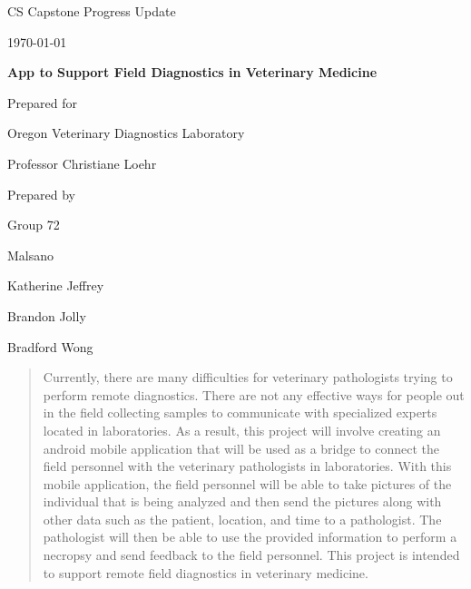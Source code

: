 \documentclass[onecolumn, draftclsnofoot,10pt, compsoc]{IEEEtran}
\def \CapstoneTeamName{		Malsano}
\def \CapstoneTeamNumber{		72}
\def \GroupMemberOne{			Katherine Jeffrey}
\def \GroupMemberTwo{			Brandon Jolly}
\def \GroupMemberThree{			Bradford Wong}
\def \CapstoneProjectName{		App to Support Field Diagnostics in Veterinary Medicine}
\def \CapstoneSponsorCompany{	Oregon Veterinary Diagnostics Laboratory}
\def \CapstoneSponsorPerson{		Professor Christiane Loehr}
\def \DocType{		%
				Progress Update
				}
\newcommand{\NameSigPair}[1]{\par
\makebox[2.75in][r]{#1} \hfil 	\makebox[3.25in]{\makebox[2.25in]{\hrulefill} \hfill		\makebox[.75in]{\hrulefill}}
\par\vspace{-12pt} \textit{\tiny\noindent
\makebox[2.75in]{} \hfil		\makebox[3.25in]{\makebox[2.25in][r]{Signature} \hfill	\makebox[.75in][r]{Date}}}}
\renewcommand{\NameSigPair}[1]{#1}
\begin{document}
\begin{titlepage}
    \begin{singlespace}
        \hfill 
        \par\vspace{.2in}
        \centering
        \scshape{
            \huge CS Capstone \DocType \par
            {\large\today}\par
            \vspace{.5in}
            \textbf{\Huge\CapstoneProjectName}\par
            \vfill
            {\large Prepared for}\par
            \Huge \CapstoneSponsorCompany\par
            \vspace{5pt}
            {\Large\NameSigPair{\CapstoneSponsorPerson}\par}
            {\large Prepared by }\par
            Group\CapstoneTeamNumber\par
            \CapstoneTeamName\par 
            \vspace{5pt}
            {\Large
                \NameSigPair{\GroupMemberOne}\par
                \NameSigPair{\GroupMemberTwo}\par
                \NameSigPair{\GroupMemberThree}\par
            }
            \vspace{20pt}
        }
        \begin{abstract}
        	Currently, there are many difficulties for veterinary pathologists trying to perform remote diagnostics. There are not any effective ways for people out in the field collecting samples to communicate with specialized experts located in laboratories. As a result, this project will involve creating an android mobile application that will be used as a bridge to connect the field personnel with the veterinary pathologists in laboratories. With this mobile application, the field personnel will be able to take pictures of the individual that is being analyzed and then send the pictures along with other data such as the patient, location, and time to a pathologist. The pathologist will then be able to use the provided information to perform a necropsy and send feedback to the field personnel. This project is intended to support remote field diagnostics in veterinary medicine.
        \end{abstract}     
    \end{singlespace}
\end{titlepage}
\newpage
{}
\tableofcontents
\clearpage
\end{document}
